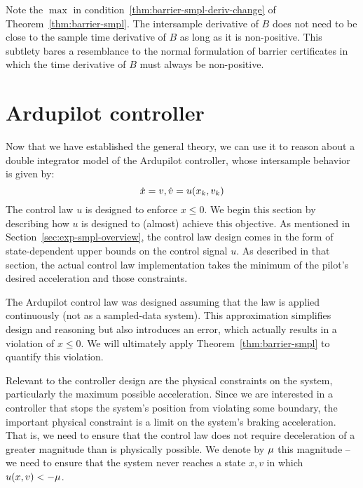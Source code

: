 Note the $\max{}$ in condition~\eqref{thm:barrier-smpl-deriv-change} of
Theorem~\ref{thm:barrier-smpl}. The intersample derivative of $B$ does not
need to be close to the sample time derivative of $B$ as long as it is
non-positive. This subtlety bares a resemblance to the normal formulation
of barrier certificates in which the time derivative of $B$ must always be
non-positive.

\section{Ardupilot controller}
\label{sec:proof-geofence}
Now that we have established the general theory, we can use it to reason
about a double integrator model of the Ardupilot controller, whose
intersample behavior is given by:
\[
\dot{x} = v, \dot{v} = u(x_k,v_k)
\]
The control law $u$ is designed to enforce $x \leq 0$.  We begin this
section by describing how $u$ is designed to (almost) achieve this
objective. As mentioned in Section~\ref{sec:exp-smpl-overview}, the control
law design comes in the form of state-dependent upper bounds on the control
signal $u$. As described in that section, the actual control law
implementation takes the minimum of the pilot's desired acceleration and
those constraints.

The Ardupilot control law was designed assuming that the law is applied
continuously (not as a sampled-data system). This approximation simplifies
design and reasoning but also introduces an error, which actually results
in a violation of $x \leq 0$. We will ultimately apply
Theorem~\ref{thm:barrier-smpl} to quantify this violation.

Relevant to the controller design are the physical constraints on the
system, particularly the maximum possible acceleration. Since we are
interested in a controller that stops the system's position from violating
some boundary, the important physical constraint is a limit on the system's
braking acceleration. That is, we need to ensure that the control law does
not require deceleration of a greater magnitude than is physically
possible. We denote by $\mu$ this magnitude -- we need to ensure that the
system never reaches a state $x,v$ in which $u(x,v) < -\mu$.

